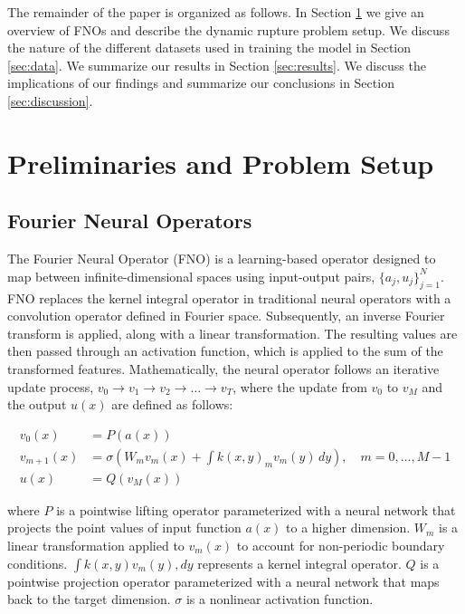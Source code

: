 \documentclass[draft]{agujournal2019}
\begin{document}
The remainder of the paper is organized as follows. In Section \ref{sec:methodology} we give an overview of FNOs and describe the dynamic rupture problem setup. We discuss the nature of the different datasets used in training the model in Section \ref{sec:data}. We summarize our results in Section \ref{sec:results}. We discuss the implications of our findings and summarize our conclusions in Section \ref{sec:discussion}.

\section{Preliminaries and Problem Setup}
\label{sec:methodology}

\subsection{Fourier Neural Operators}
\label{sec:fno}

The Fourier Neural Operator (FNO) is a learning-based operator designed to map between infinite-dimensional spaces using input-output pairs, $\{a_j, u_j\}_{j=1}^{N}$. FNO replaces the kernel integral operator in traditional neural operators with a convolution operator defined in Fourier space. Subsequently, an inverse Fourier transform is applied, along with a linear transformation. The resulting values are then passed through an activation function, which is applied to the sum of the transformed features. Mathematically, the neural operator follows an iterative update process, $v_0 \rightarrow v_1 \rightarrow v_2 \rightarrow \dots \rightarrow v_T$, where the update from $v_0$ to $v_M$ and the output $u(x)$ are defined as follows:

\begin{equation}
\label{eqn:fno}
\begin{aligned}
    v_{0}(x) &= P(a(x)) \\
    v_{m+1}(x) &= \sigma\left(W_{m} v_{m}(x) + \int k(x,y)_{m} v_{m}(y)\,dy \right), \quad m=0,\dots,M-1 \\
    u(x) &= Q(v_{M}(x))
\end{aligned}
\end{equation}

where $P$ is a pointwise lifting operator parameterized with a neural network that projects the point values of input function $a(x)$ to a higher dimension. $W_m$ is a linear transformation applied to $v_m(x)$ to account for non-periodic boundary conditions. $\int k(x,y) v_m(y),dy$ represents a kernel integral operator. $Q$ is a pointwise projection operator parameterized with a neural network that maps back to the target dimension. $\sigma$ is a nonlinear activation function.
\end{document}

